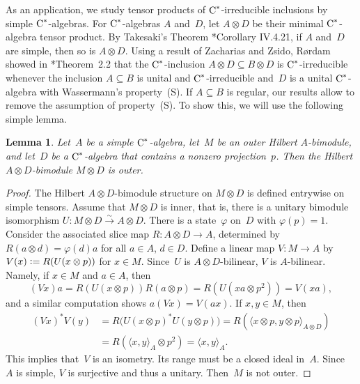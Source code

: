 \documentclass[a4paper]{amsart}
\theoremstyle{plain}
\newtheorem{lemma}[theorem]{Lemma}
\theoremstyle{definition}
\theoremstyle{remark}
\numberwithin{theorem}{section}
\numberwithin{equation}{section}
\newcommand*{\nb}{\nobreakdash}
\newcommand*{\Cst}{\textup C^*}%
\newcommand*{\defeq}{\mathrel{\vcentcolon=}}%
\newcommand*{\congto}{\xrightarrow\sim}
\begin{document}
As an application, we study tensor products of \(\Cst\)\nb-irreducible
inclusions by simple \(\Cst\)\nb-algebras.
For \(\Cst\)\nb-algebras \(A\) and~\(D\), let \(A\otimes D\) be their
minimal \(\Cst\)\nb-algebra tensor product.
By Takesaki's Theorem \cite{Takesaki:Theory_1}*{Corollary IV.4.21},
if \(A\) and~\(D\) are simple, then so is \(A\otimes D\).
Using a result of Zacharias and Zsido, Rørdam showed in
\cite{Rordam:Irreducible_inclusions}*{Theorem~2.2} that the
\(\Cst\)\nb-inclusion \(A\otimes D\subseteq B\otimes D\) is
\(\Cst\)\nb-irreducible whenever the inclusion \(A\subseteq B\) is unital
and \(\Cst\)\nb-irreducible  and~\(D\) is a unital
\(\Cst\)\nb-algebra with Wassermann's property~(S).
If \(A\subseteq B\) is regular,  our results allow  to remove the assumption of
property~(S).
To show this, we will use the following simple lemma.

\begin{lemma}
  \label{lem:tensoring_outer_gives_outer}
  Let~\(A\) be a simple \(\Cst\)\nb-algebra, let~\(M\)  be an outer
  Hilbert \(A\)\nb-bimodule, and let~\(D\) be a \(\Cst\)\nb-algebra
  that contains a nonzero projection~\(p\).
  Then the Hilbert \(A\otimes D\)\nb-bimodule \(M\otimes D\) is outer.
\end{lemma}

\begin{proof}
  The Hilbert \(A\otimes D\)-bimodule structure on \(M\otimes D\) is
  defined entrywise on simple tensors.
  Assume that \(M\otimes D\) is inner, that is, there is a unitary
  bimodule isomorphism
  \(U\colon M\otimes D\congto A\otimes D\).
  There is a state~\(\varphi\) on~\(D\) with \(\varphi(p)=1\).
  Consider the associated slice map \(R\colon A\otimes D\to A\),
  determined by \(R(a\otimes d)= \varphi(d)a\) for all \(a\in A\),
  \(d\in D\).
  Define a linear map \(V\colon M\to A\) by \(V(x)\defeq R(U(x\otimes
  p))\) for \(x\in M\).
  Since~\(U\) is \(A\otimes D\)-bilinear, \(V\) is \(A\)\nb-bilinear.
  Namely, if \(x\in M\) and \(a\in A\), then
  \[
    (Vx)  a
    = R(U(x\otimes p))R(a\otimes p)
    = R(U(x a \otimes p^2))
    = V(x a),
  \]
  and a similar computation shows \(a(V x)=V(a x)\).
  If \(x,y \in M\), then
  \begin{align*}
    (Vx)^*V(y)
    &= R\bigl(U(x\otimes p)^* U(y\otimes p)\bigr)
    = R(\langle x\otimes p, y\otimes p \rangle_{A\otimes D})
    \\
		&=R(\langle x,y\rangle_A \otimes p^2)
    = \langle x,y\rangle_A.
  \end{align*}
  This implies that~\(V\) is an isometry.
  Its range must be a closed ideal in~\(A\).
  Since~\(A\) is simple, \(V\) is surjective and thus a unitary.
  Then~\(M\) is not outer.
\end{proof}
\end{document}
